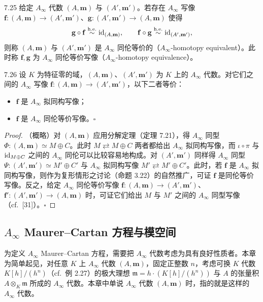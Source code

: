\begin{definition}{7.25}
给定 $A_\infty$ 代数 $(A,\mathbf m)$ 与 $(A',\mathbf m')$。若存在 $A_\infty$ 写像 $\mathbf f\colon(A,\mathbf m)\to(A',\mathbf m')$、$\mathbf g\colon(A',\mathbf m')\to(A,\mathbf m)$ 使得
\[
  \mathbf g\circ\mathbf f\overset{\mathrm{h.e.}}{\sim}\mathrm{id}_{(A,\mathbf m)},\qquad
  \mathbf f\circ\mathbf g\overset{\mathrm{h.e.}}{\sim}\mathrm{id}_{(A',\mathbf m')},
\]
则称 $(A,\mathbf m)$ 与 $(A',\mathbf m')$ 是 $A_\infty$ 同伦等价的（$A_\infty$-homotopy equivalent）。此时称 $\mathbf f,\mathbf g$ 为 $A_\infty$ 同伦等价写像（$A_\infty$-homotopy equivalence）。
\end{definition}

\begin{theorem}{7.26}
设 $K$ 为特征零的域，$(A,\mathbf m)$、$(A',\mathbf m')$ 为 $K$ 上的 $A_\infty$ 代数。对它们之间的 $A_\infty$ 写像 $\mathbf f\colon(A,\mathbf m)\to(A',\mathbf m')$，以下二者等价：
\begin{itemize}[leftmargin=1.6em,itemsep=1pt,topsep=1pt]
  \item $\mathbf f$ 是 $A_\infty$ 拟同构写像；
  \item $\mathbf f$ 是 $A_\infty$ 同伦等价写像。\hfill$\square$
\end{itemize}
\end{theorem}

\begin{proof}
（概略）对 $(A,\mathbf m)$ 应用分解定理（定理 7.21），得 $A_\infty$ 同型 $\Phi\colon(A,\mathbf m)\simeq M\oplus C$。此时 $M\rightleftarrows M\oplus C$ 两者都给出 $A_\infty$ 拟同构写像，而 $\iota\circ\pi$ 与 $\mathrm{id}_{M\oplus C}$ 之间的 $A_\infty$ 同伦可以比较容易地构成。对 $(A',\mathbf m')$ 同样得 $A_\infty$ 同型 $\Psi\colon(A',\mathbf m')\simeq M'\oplus C'$ 与 $A_\infty$ 拟同构写像 $M'\rightleftarrows M'\oplus C'$。此时，若 $\mathbf f$ 是 $A_\infty$ 拟同构写像，则作为复形情形之讨论（命题 3.22）的自然推广，可证 $\mathbf f$ 是同伦等价写像。反之，给定 $A_\infty$ 同伦等价写像 $\mathbf f\colon(A,\mathbf m)\to(A',\mathbf m')$、$\mathbf f'\colon(A',\mathbf m')\to(A,\mathbf m)$ 时，可证它们给出 $M$ 与 $M'$ 之间的 $A_\infty$ 同型写像（cf.\ [31]）。\hfill$\square$
\end{proof}

\subsection{$A_\infty$ Maurer--Cartan 方程与模空间}

为定义 $A_\infty$ Maurer--Cartan 方程，需要把 $A_\infty$ 代数考虑为具有良好性质者。本章为简单起见，对任意 $K$ 上 $A_\infty$ 代数 $(A,\mathbf m)$，固定正整数 $n$，考虑可换 $K$ 代数 $K[h]/(h^{n})$（cf.\ 例 2.27）的极大理想 $\mathfrak m=h\cdot(K[h]/(h^{n}))$ 与 $A$ 的张量积 $A\otimes_{K}\mathfrak m$ 所成的 $A_\infty$ 代数。本章中单说 $A_\infty$ 代数 $(A,\mathbf m)$ 时，指的就是这样的 $A_\infty$ 代数。

